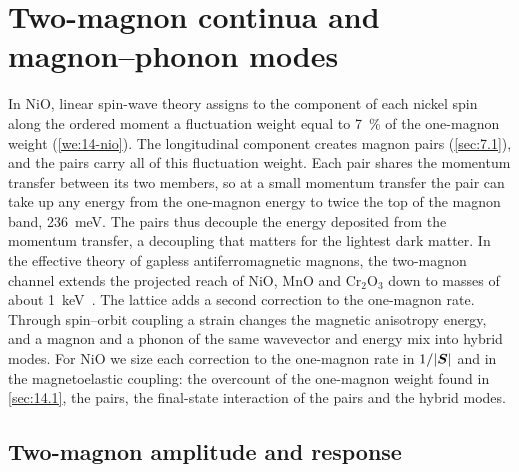 \section{Two-magnon continua and magnon--phonon modes}\label{sec:14.2}

In NiO, linear spin-wave theory assigns to the component of each nickel spin along the ordered moment a fluctuation weight equal to \SI{7}{\percent} of the one-magnon weight (\cref{we:14-nio}). The longitudinal component creates magnon pairs (\cref{sec:7.1}), and the pairs carry all of this fluctuation weight. Each pair shares the momentum transfer between its two members, so at a small momentum transfer the pair can take up any energy from the one-magnon energy to twice the top of the magnon band, \SI{236}{meV}. The pairs thus decouple the energy deposited from the momentum transfer, a decoupling that matters for the lightest dark matter. In the effective theory of gapless antiferromagnetic magnons, the two-magnon channel extends the projected reach of NiO, MnO and Cr$_2$O$_3$ down to masses of about \SI{1}{keV}~\cite{esposito2023optimal}. The lattice adds a second correction to the one-magnon rate. Through spin--orbit coupling a strain changes the magnetic anisotropy energy, and a magnon and a phonon of the same wavevector and energy mix into hybrid modes. For NiO we size each correction to the one-magnon rate in $1/|\bm{S}|$ and in the magnetoelastic coupling: the overcount of the one-magnon weight found in \cref{sec:14.1}, the pairs, the final-state interaction of the pairs and the hybrid modes.

\subsection{Two-magnon amplitude and response}\label{sec:14.2-amp}

